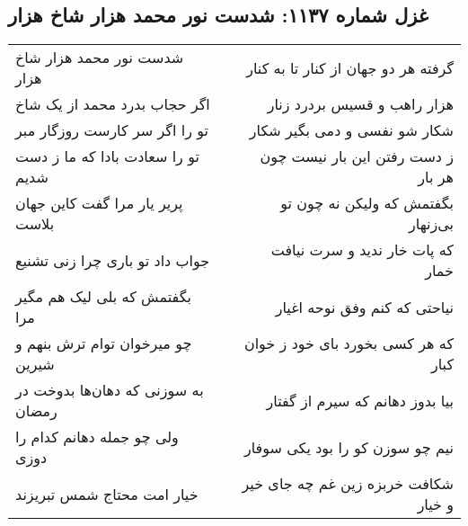 \begin{center}
\section*{غزل شماره ۱۱۳۷: شدست نور محمد هزار شاخ هزار}
\label{sec:1137}
\begin{longtable}{l p{0.5cm} r}
شدست نور محمد هزار شاخ هزار
&&
گرفته هر دو جهان از کنار تا به کنار
\\
اگر حجاب بدرد محمد از یک شاخ
&&
هزار راهب و قسیس بردرد زنار
\\
تو را اگر سر کارست روزگار مبر
&&
شکار شو نفسی و دمی بگیر شکار
\\
تو را سعادت بادا که ما ز دست شدیم
&&
ز دست رفتن این بار نیست چون هر بار
\\
پریر یار مرا گفت کاین جهان بلاست
&&
بگفتمش که ولیکن نه چون تو بی‌زنهار
\\
جواب داد تو باری چرا زنی تشنیع
&&
که پات خار ندید و سرت نیافت خمار
\\
بگفتمش که بلی لیک هم مگیر مرا
&&
نیاحتی که کنم وفق نوحه اغیار
\\
چو میرخوان توام ترش بنهم و شیرین
&&
که هر کسی بخورد بای خود ز خوان کبار
\\
به سوزنی که دهان‌ها بدوخت در رمضان
&&
بیا بدوز دهانم که سیرم از گفتار
\\
ولی چو جمله دهانم کدام را دوزی
&&
نیم چو سوزن کو را بود یکی سوفار
\\
خیار امت محتاج شمس تبریزند
&&
شکافت خربزه زین غم چه جای خیر و خیار
\\
\end{longtable}
\end{center}
